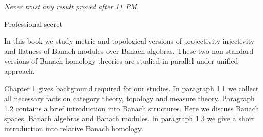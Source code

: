 \documentclass[11pt, a4paper, oneside]{thbook}
\begin{document}
\pagestyle{empty} 

\null\vfill 

\textit{Never trust any result proved after 11 PM.}

\begin{flushright}
Professional secret
\end{flushright}

\vfill\vfill\vfill\vfill\vfill\vfill\null{}

\clearpage %




In this book we study metric and topological versions of projectivity
injectivity and flatness of Banach modules over Banach algebras. These two 
non-standard versions of Banach homology theories are studied in parallel under
unified approach.

Chapter 1 gives background required for our studies. In paragraph 1.1 we collect
all necessary facts on category theory, topology and measure theory. Paragraph
1.2 contains a brief introduction into Banach structures. Here we discuss Banach
spaces, Banach algebras and Banach modules. In paragraph 1.3 we give a short
introduction into relative Banach homology. 
\end{document}

